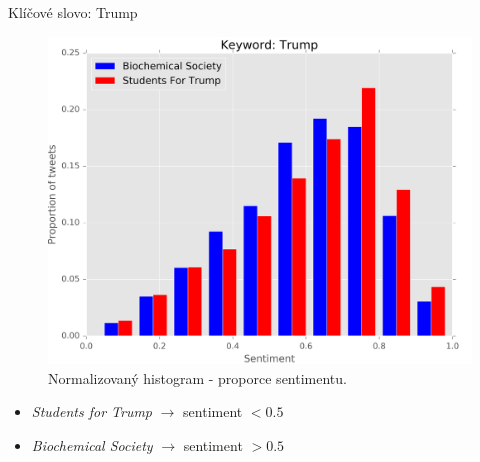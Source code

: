 \documentclass[notheorems,12pt]{beamer}
\begin{document}
\begin{frame}{Klíčové slovo: Trump}
    \begin{figure}
        \centering
        \includegraphics[scale=0.37]{./Pics/trump-normed.png}
        \vspace{-0.2cm}
        \caption*{Normalizovaný histogram - proporce sentimentu.}
    \end{figure}
    \vspace{-0.4cm}
	\begin{itemize}
        \item \textit{Students for Trump} $\rightarrow$ sentiment $< 0.5$
		\item \textit{Biochemical Society} $\rightarrow$ sentiment $> 0.5$
	\end{itemize}
\end{frame}
\end{document}
